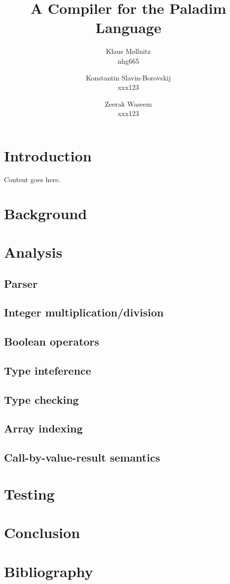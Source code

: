 \documentclass[10pt]{article}
\title{A Compiler for the \textbf{Paladim} Language}
\author{
    Klaus Møllnitz\\
    nhg665
  \and
    Konstantin Slavin-Borovskij\\
    xxx123 %
  \and
    Zeerak Waseem\\
    xxx123 %
}
\begin{document}
\maketitle

\section{Introduction}
Content goes here.

\section{Background}

\section{Analysis}
\subsection{Parser}
\subsection{Integer multiplication/division}
\subsection{Boolean operators}
\subsection{Type inteference}
\subsection{Type checking}
\subsection{Array indexing}
\subsection{Call-by-value-result semantics}

\section{Testing}

\section{Conclusion}

\section{Bibliography}

\end{document}
